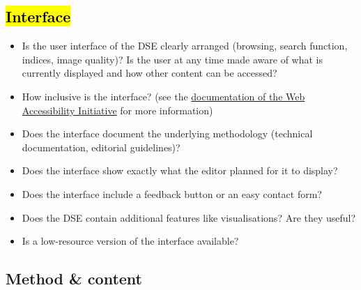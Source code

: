 \documentclass[
  letterpaper,
  DIV=11,
  numbers=noendperiod]{scrreprt}
\providecommand{\tightlist}{%
  \setlength{\itemsep}{0pt}\setlength{\parskip}{0pt}}\usepackage{longtable,booktabs,array}
\begin{document}
\subsection{\texorpdfstring{\hl{Interface}}{Interface}}\label{interface}

\begin{itemize}
\tightlist
\item
  Is the user interface of the DSE clearly arranged (browsing, search
  function, indices, image quality)? Is the user at any time made aware
  of what is currently displayed and how other content can be accessed?
\end{itemize}

\begin{itemize}
\item
  How inclusive is the interface? (see the
  \href{https://www.w3.org/WAI/fundamentals/accessibility-usability-inclusion/}{documentation
  of the Web Accessibility Initiative} for more information)
\item
  Does the interface document the underlying methodology (technical
  documentation, editorial guidelines)?
\item
  Does the interface show exactly what the editor planned for it to
  display?
\item
  Does the interface include a feedback button or an easy contact form?
\end{itemize}

\begin{itemize}
\tightlist
\item
  Does the DSE contain additional features like visualisations? Are they
  useful?
\end{itemize}

\begin{itemize}
\tightlist
\item
  Is a low-resource version of the interface available? \hl{}
\end{itemize}

\subsection{Method \& content}\label{method-content}
\end{document}
